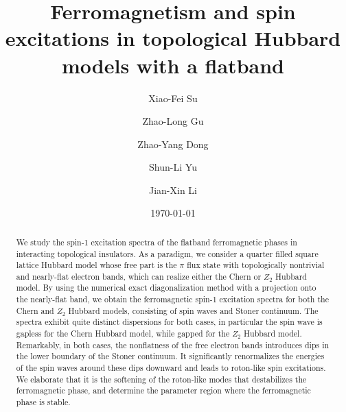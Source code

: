 \documentclass[amsmath,superscriptaddress,showpacs,aps,prb,twocolumn]{revtex4-1}
\begin{document}
\title{Ferromagnetism and spin excitations in topological Hubbard models with a flatband}
\author{Xiao-Fei Su}
\author{Zhao-Long Gu}
\author{Zhao-Yang Dong}
\author{Shun-Li Yu}
\author{Jian-Xin Li}
\date{\today}

\begin{abstract}
\par We study the spin-1 excitation spectra of the flatband ferromagnetic phases in interacting topological insulators. As a paradigm, we consider a quarter filled square lattice Hubbard model whose free part is the $\pi$ flux state with topologically nontrivial and nearly-flat electron bands, which can realize either the Chern or $Z_2$ Hubbard model. By using the numerical exact diagonalization method with a projection onto the nearly-flat band, we obtain the ferromagnetic spin-1 excitation spectra for both the Chern and $Z_2$ Hubbard models, consisting of spin waves and Stoner continuum. The spectra exhibit quite distinct dispersions for both cases, in particular the spin wave is gapless for the Chern Hubbard model, while gapped for the $Z_2$ Hubbard model. Remarkably, in both cases, the nonflatness of the free electron bands introduces dips in the lower boundary of the Stoner continuum. It significantly renormalizes the energies of the spin waves around these dips downward and leads to roton-like spin excitations. We elaborate that it is the softening of the roton-like modes that destabilizes the ferromagnetic phase, and determine the parameter region where the ferromagnetic phase is stable.
\end{abstract}
\maketitle
\end{document}
